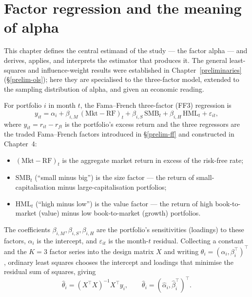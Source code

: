 \hypertarget{factor-model}{}
\hypertarget{factor-regression-and-the-meaning-of-alpha}{%
\chapter{Factor regression and the meaning of
alpha}\label{factor-regression-and-the-meaning-of-alpha}}

This chapter defines the central estimand of the study --- the factor
alpha --- and derives, applies, and interprets the estimator that produces
it. The general least-squares and influence-weight results were
established in Chapter~\ref{preliminaries} (\S\ref{prelim-ols}); here they
are specialised to the three-factor model, extended to the sampling
distribution of alpha, and given an economic reading.

For portfolio $i$ in month $t$, the Fama--French three-factor (FF3)
regression is
\begin{equation}\label{eq:ff3}
y_{it} = \alpha_i + \beta_{i,M}\,(\mathrm{Mkt}\!-\!\mathrm{RF})_t
        + \beta_{i,S}\,\mathrm{SMB}_t + \beta_{i,H}\,\mathrm{HML}_t
        + \varepsilon_{it},
\end{equation}
where $y_{it}=r_{it}-r_{ft}$ is the portfolio's excess return and the three
regressors are the traded Fama--French factors introduced in
\S\ref{prelim-ff} and constructed in Chapter~4:
\begin{itemize}
\tightlist
\item
  $(\mathrm{Mkt}\!-\!\mathrm{RF})_t$ is the aggregate market return in
  excess of the risk-free rate;
\item
  $\mathrm{SMB}_t$ (``small minus big'') is the size factor --- the return
  of small-capitalisation minus large-capitalisation portfolios;
\item
  $\mathrm{HML}_t$ (``high minus low'') is the value factor --- the return
  of high book-to-market (value) minus low book-to-market (growth)
  portfolios.
\end{itemize}
The coefficients $\beta_{i,M},\beta_{i,S},\beta_{i,H}$ are the portfolio's
sensitivities (loadings) to these factors, $\alpha_i$ is the intercept, and
$\varepsilon_{it}$ is the month-$t$ residual. Collecting a constant and the
$K=3$ factor series into the design matrix $X$ and writing
$\theta_i=(\alpha_i,\beta_i^{\top})^{\top}$, ordinary least squares chooses
the intercept and loadings that minimise the residual sum of squares,
giving
\begin{equation}\label{eq:ols-theta}
\hat\theta_i = (X^{\top}X)^{-1}X^{\top}y_i,
\qquad \hat\theta_i=(\hat\alpha_i,\hat\beta_i^{\top})^{\top} .
\end{equation}

